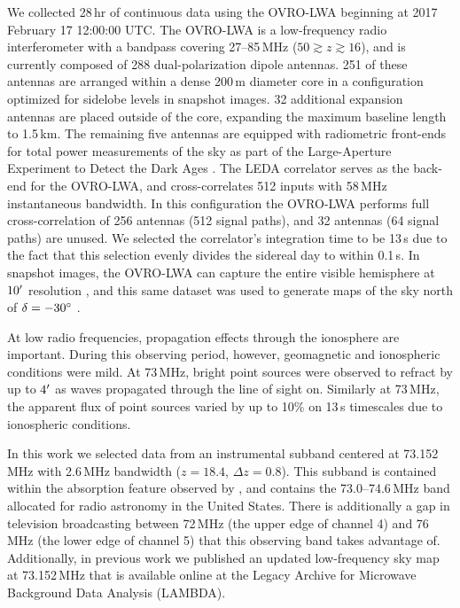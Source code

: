\begin{bibunit}
We collected 28\,hr of continuous data using the OVRO-LWA beginning at 2017 February 17 12:00:00
UTC. The OVRO-LWA is a low-frequency radio interferometer with a bandpass covering 27--85\,MHz ($50
\gtrsim z \gtrsim 16$), and is currently composed of 288 dual-polarization dipole antennas.  251 of
these antennas are arranged within a dense 200\,m diameter core in a configuration optimized for
sidelobe levels in snapshot images.  32 additional expansion antennas are placed outside of the
core, expanding the maximum baseline length to 1.5\,km. The remaining five antennas are equipped
with radiometric front-ends for total power measurements of the sky as part of the Large-Aperture
Experiment to Detect the Dark Ages \citep[LEDA;][]{2018MNRAS.478.4193P}.  The LEDA correlator serves
as the back-end for the OVRO-LWA, and cross-correlates 512 inputs with 58\,MHz instantaneous
bandwidth.  In this configuration the OVRO-LWA performs full cross-correlation of 256 antennas (512
signal paths), and 32 antennas (64 signal paths) are unused.  We selected the correlator's
integration time to be 13\,s due to the fact that this selection evenly divides the sidereal day to
within 0.1\,s.  In snapshot images, the OVRO-LWA can capture the entire visible hemisphere at
$10\mbox{$^\prime$}$ resolution \citep[e.g.,][]{2017arXiv171106665A}, and this same dataset was used to
generate maps of the sky north of $\delta=-30\mbox{$^\circ$}$ \citep{2018AJ....156...32E}.

At low radio frequencies, propagation effects through the ionosphere are important.  During this
observing period, however, geomagnetic and ionospheric conditions were mild. At 73\,MHz, bright
point sources were observed to refract by up to $4\mbox{$^\prime$}$ as waves propagated through the line of
sight on. Similarly at 73\,MHz, the apparent flux of point sources varied by up to 10\% on 13\,s
timescales due to ionospheric conditions.

In this work we selected data from an instrumental subband centered at 73.152\,MHz with 2.6\,MHz
bandwidth ($z=18.4$, $\Delta z=0.8$). This subband is contained within the absorption feature
observed by \citet{2018Natur.555...67B}, and contains the 73.0--74.6\,MHz band allocated for radio
astronomy in the United States. There is additionally a gap in television broadcasting between
72\,MHz (the upper edge of channel 4) and 76\,MHz (the lower edge of channel 5) that this observing
band takes advantage of.  Additionally, in previous work we published an updated low-frequency sky
map at 73.152\,MHz \citep{2018AJ....156...32E} that is available online at the Legacy Archive for
Microwave Background Data Analysis (LAMBDA).


\end{bibunit}
